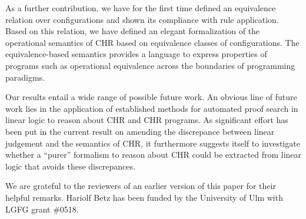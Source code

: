 \documentclass[acmtocl]{acmtrans2m}
\begin{document}
As a further contribution, we have for the first time defined an equivalence
relation over configurations and shown its compliance with rule application.
Based on this relation, we have defined an elegant formalization of the
operational semantics of CHR based on equivalence classes of
configurations. The equivalence-based semantics provides a language to express
properties of programs such as operational equivalence across the boundaries of
programming paradigms.

Our results entail a wide range of possible future work. An obvious line of
future work lies in the application of established methods for automated proof
search in linear logic to reason about CHR and CHR programs. As
significant effort has been put in the current result on amending the discrepance
between linear judgement and the semantics of CHR, it furthermore suggests itself
to investigate whether a ``purer'' formalism to reason about CHR could be
extracted from linear logic that avoids these discrepances.

\begin{acks} We are grateful to the reviewers of an earlier version of this paper
for their helpful remarks. Hariolf Betz has been funded by the University of Ulm
with LGFG grant \#0518.
\end{acks}



\end{document}
